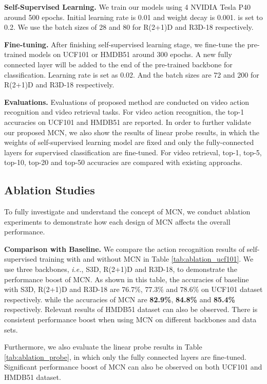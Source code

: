 \documentclass[10pt,twocolumn,letterpaper]{article}
\begin{document}
\textbf{Self-Supervised Learning.} We train our models using 4 NVIDIA Tesla P40 around 500 epochs. Initial learning rate is 0.01 and weight decay is 0.001.  is set to 0.2. We use the batch sizes of 28 and 80 for R(2+1)D and R3D-18 respectively.

\textbf{Fine-tuning.} After finishing self-supervised learning stage, we fine-tune the pre-trained models on UCF101 or HMDB51 around 300 epochs. A new fully connected layer will be added to the end of the pre-trained backbone for classification. Learning rate is set as 0.02. And the batch sizes are 72 and 200 for R(2+1)D and R3D-18 respectively.

\textbf{Evaluations.} Evaluations of proposed method are conducted on video action recognition and video retrieval tasks. For video action recognition, the top-1 accuracies on UCF101 \cite{soomro2012ucf101} and HMDB51 \cite{kuehne2011hmdb} are reported. In order to further validate our proposed MCN, we also show the results of linear probe results, in which the weights of self-supervised learning model are fixed and only the fully-connected layers for supervised classification are fine-tuned. For video retrieval, top-1, top-5, top-10, top-20 and top-50 accuracies are compared with existing approachs.

\subsection{Ablation Studies}
To fully investigate and understand the concept of MCN, we conduct ablation experiments to demonstrate how each design of MCN affects the overall performance.
	
\textbf{Comparison with Baseline.} We compare the action recognition results of self-supervised training with and without MCN in Table \ref{tab:ablation_ucf101}. We use three backbones, \textit{i.e.}, S3D, R(2+1)D and R3D-18, to demonstrate the performance boost of MCN. As shown in this table, the accuracies of baseline with S3D, R(2+1)D and R3D-18 are 76.7\%, 77.3\% and 78.6\% on UCF101 dataset respectively. while the accuracies of MCN are \textbf{82.9\%}, \textbf{84.8\%} and \textbf{85.4\%} respectively. Relevant results of HMDB51 dataset can also be observed. There is consistent performance boost when using MCN on different backbones and data sets.

Furthermore, we also evaluate the linear probe results in Table \ref{tab:ablation_probe}, in which only the fully connected layers are fine-tuned. Significant performance boost of MCN can also be observed on both UCF101 and HMDB51 dataset. 
\end{document}
